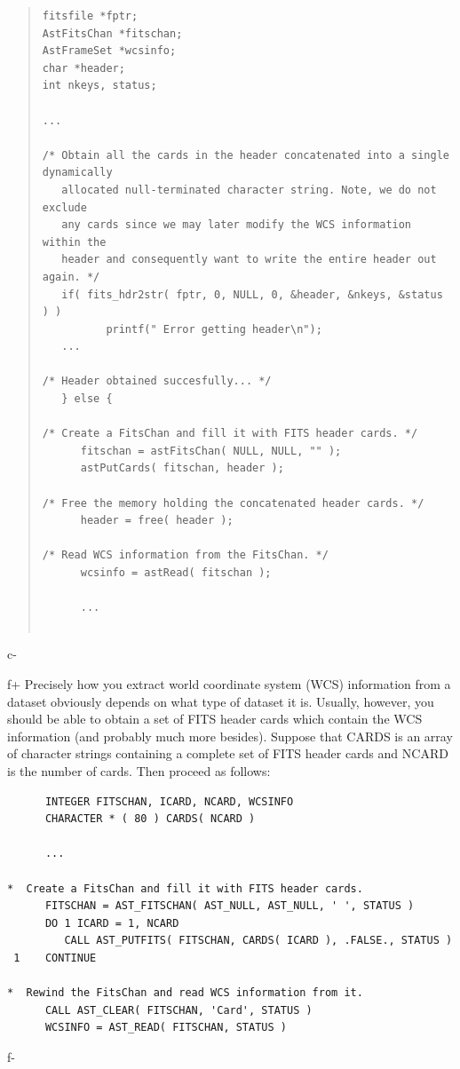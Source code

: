 \documentclass[twoside,11pt]{article}
\begin{document}
\begin{quote}
\small
\begin{verbatim}
fitsfile *fptr;
AstFitsChan *fitschan;
AstFrameSet *wcsinfo;
char *header;
int nkeys, status;

...

/* Obtain all the cards in the header concatenated into a single dynamically 
   allocated null-terminated character string. Note, we do not exclude
   any cards since we may later modify the WCS information within the
   header and consequently want to write the entire header out again. */
   if( fits_hdr2str( fptr, 0, NULL, 0, &header, &nkeys, &status ) )
          printf(" Error getting header\n");
   ...

/* Header obtained succesfully... */
   } else {

/* Create a FitsChan and fill it with FITS header cards. */
      fitschan = astFitsChan( NULL, NULL, "" );
      astPutCards( fitschan, header );

/* Free the memory holding the concatenated header cards. */
      header = free( header );

/* Read WCS information from the FitsChan. */
      wcsinfo = astRead( fitschan );

      ...
  
\end{verbatim}
\normalsize
\end{quote}
c-

f+
Precisely how you extract world coordinate system (WCS) information
from a dataset obviously depends on what type of dataset it
is. Usually, however, you should be able to obtain a set of FITS
header cards which contain the WCS information (and probably much more
besides). Suppose that CARDS is an array of character strings
containing a complete set of FITS header cards and NCARD is the number
of cards. Then proceed as follows:

\small
\begin{verbatim}
      INTEGER FITSCHAN, ICARD, NCARD, WCSINFO
      CHARACTER * ( 80 ) CARDS( NCARD )

      ...

*  Create a FitsChan and fill it with FITS header cards.
      FITSCHAN = AST_FITSCHAN( AST_NULL, AST_NULL, ' ', STATUS )
      DO 1 ICARD = 1, NCARD
         CALL AST_PUTFITS( FITSCHAN, CARDS( ICARD ), .FALSE., STATUS )
 1    CONTINUE

*  Rewind the FitsChan and read WCS information from it.
      CALL AST_CLEAR( FITSCHAN, 'Card', STATUS )
      WCSINFO = AST_READ( FITSCHAN, STATUS )
\end{verbatim}
\normalsize
f-
\end{document}
